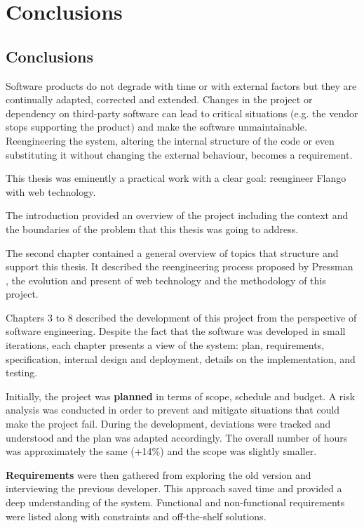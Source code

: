 \chapter{Conclusions}
\section{Conclusions}
Software products do not degrade with time or with external factors but they are continually adapted, corrected and extended.
Changes in the project or dependency on third-party software can lead to critical situations  (e.g. the vendor stops supporting the product) and make the software unmaintainable.
Reengineering the system, altering the internal structure of the code or even substituting it without changing the external behaviour, becomes a requirement.

This thesis was eminently a practical work with a clear goal: reengineer Flango \cm with web technology.

The introduction provided an overview of the project including the context and the boundaries of the problem that this thesis was going to address.

The second chapter contained a general overview of topics that structure and support this thesis.
It described the reengineering process proposed by Pressman \cite{Pressman:2007}, the evolution and present of web technology and the methodology of this project.

Chapters 3 to 8 described the development of this project from the perspective of software engineering.
Despite the fact that the software was developed in small iterations, each chapter presents a view of the system: plan, requirements, specification, internal design and deployment, details on the implementation, and testing.

Initially, the project was \textbf{planned} in terms of scope, schedule and budget. 
A risk analysis was conducted in order to prevent and mitigate situations that could make the project fail.
During the development, deviations were tracked and understood and the plan was adapted accordingly.
The overall number of hours was approximately the same (+14\%) and the scope was slightly smaller.

\textbf{Requirements} were then gathered from exploring the old version and interviewing the previous developer.
This approach saved time and provided a deep understanding of the system.
Functional and non-functional requirements were listed along with constraints and off-the-shelf solutions.

